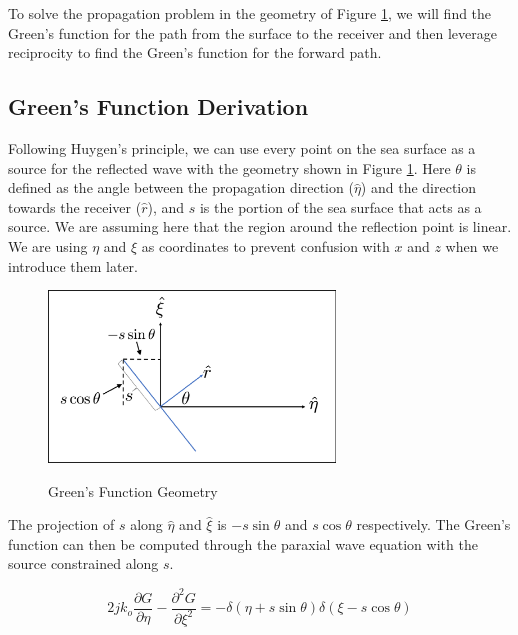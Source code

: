 To solve the propagation problem in the geometry of Figure \ref{mp_fig:2a}, we will find the Green's function for the path from the surface to the receiver and then leverage reciprocity to find the Green's function for the forward path.

\subsection{Green's Function Derivation}
Following Huygen's principle, we can use every point on the sea surface as a source for the reflected wave with the geometry shown in Figure \ref{mp_fig:2a}. Here $\theta$ is defined as the angle between the propagation direction ($\hat{\eta}$) and the direction towards the receiver ($\hat{r}$), and $s$ is the portion of the sea surface that acts as a source. We are assuming here that the region around the reflection point is linear. We are using $\eta$ and $\xi$ as coordinates to prevent confusion with $x$ and $z$ when we introduce them later.

\begin{figure}[H]
  \begin{center}
\includegraphics[width=3in]{../media/analysis/gf_geometry.png}
  \end{center}
  \renewcommand{\baselinestretch}{1} \small\normalsize
  \begin{quote}
    \caption[Green's Function Geometry ]{Green's Function Geometry\label{mp_fig:2a}}
  \end{quote}
\end{figure}
\renewcommand{\baselinestretch}{2} \small\normalsize

The projection of $s$ along $\hat{\eta}$ and $\hat{\xi}$ is $-s\sin\theta$ and $s\cos\theta$ respectively. The Green's function can then be computed through the paraxial wave equation with the source constrained along $s$.

\begin{equation}
2jk_o \frac{\partial G}{\partial \eta} - \frac{\partial^2 G}{\partial \xi^2} = -\delta(\eta + s \sin\theta)\delta(\xi - s \cos\theta)
\label{mp_eq:11a}
\end{equation}

